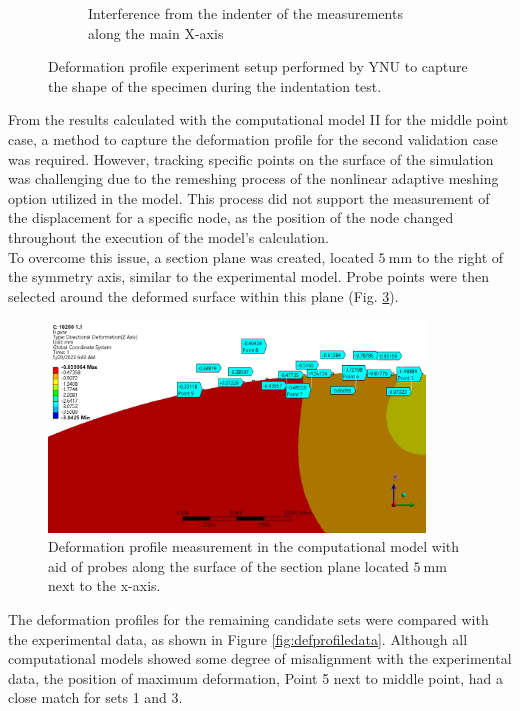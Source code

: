 \begin{figure}
\begin{subfigure}[b]{0.5\textwidth}
    \caption{Interference from the indenter of the measurements along the main X-axis}
    \label{fig:defprofinter}
    \end{subfigure}
    \hspace{0.3cm}
    \caption[Deformation profile experiment]{Deformation profile experiment setup performed by YNU to capture the shape of the specimen during the indentation test.}
    \label{fig:defprofexperiment}
\end{figure}

From the results calculated with the computational model II for the middle point case, 
a method to capture the deformation profile for the second validation case was required.
However, tracking specific points on the surface of the simulation was challenging due to 
the remeshing process of the nonlinear adaptive meshing option utilized in the model. This
process did not support the measurement of the displacement for a specific node, as the 
position of the node changed throughout the execution of the model's calculation.\\

To overcome this issue, a section plane was created, located $\SI{5}{\milli \meter}$ to the 
right of the symmetry axis, similar to the experimental model. Probe points were then
selected around the deformed surface within this plane (Fig. \ref{fig:defprofcompmodel}).

\begin{figure}%
	\centering
   \quad
   \includegraphics[width=10cm]{Images/validationcase/defprof/10200defprofile.png}%
   \caption[Deformation profile - Computational model]{Deformation profile measurement in the computational model with aid of probes along the surface of the section plane located $\SI{5}{\milli \meter}$ next to the x-axis.}%
   \label{fig:defprofcompmodel}%
\end{figure}

The deformation profiles for the remaining candidate sets were compared with the experimental
data, as shown in Figure \ref{fig:defprofiledata}. Although all computational models 
showed some degree of misalignment with the experimental data, the position of maximum deformation,
Point \SI{5}{} next to middle point, had a close match for sets \SI{1}{} and \SI{3}{}.

